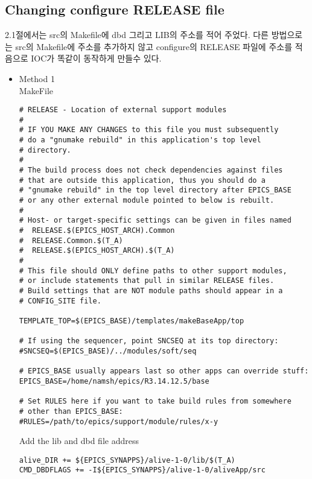 \documentclass[11pt
  , a4paper
  , article
  , oneside
]{memoir}
\begin{document}
\subsection{Changing configure RELEASE file}
2.1절에서는 src의 Makefile에 dbd 그리고 LIB의 주소를 적어 주었다. 다른 방법으로는
src의 Makefile에 주소를 추가하지 않고 configure의 RELEASE 파일에 주소를 적음으로 IOC가 똑같이
동작하게 만들수 있다.
\begin{itemize}
\item Method 1\\
MakeFile

\begin{lstlisting}[style=termstyle]
# RELEASE - Location of external support modules
#
# IF YOU MAKE ANY CHANGES to this file you must subsequently
# do a "gnumake rebuild" in this application's top level
# directory.
#
# The build process does not check dependencies against files
# that are outside this application, thus you should do a
# "gnumake rebuild" in the top level directory after EPICS_BASE
# or any other external module pointed to below is rebuilt.
#
# Host- or target-specific settings can be given in files named
#  RELEASE.$(EPICS_HOST_ARCH).Common
#  RELEASE.Common.$(T_A)
#  RELEASE.$(EPICS_HOST_ARCH).$(T_A)
#
# This file should ONLY define paths to other support modules,
# or include statements that pull in similar RELEASE files.
# Build settings that are NOT module paths should appear in a
# CONFIG_SITE file.

TEMPLATE_TOP=$(EPICS_BASE)/templates/makeBaseApp/top

# If using the sequencer, point SNCSEQ at its top directory:
#SNCSEQ=$(EPICS_BASE)/../modules/soft/seq

# EPICS_BASE usually appears last so other apps can override stuff:
EPICS_BASE=/home/namsh/epics/R3.14.12.5/base

# Set RULES here if you want to take build rules from somewhere
# other than EPICS_BASE:
#RULES=/path/to/epics/support/module/rules/x-y
\end{lstlisting}
Add the lib and dbd file address
	\begin{lstlisting}[style=termstyle]
alive_DIR += ${EPICS_SYNAPPS}/alive-1-0/lib/$(T_A)
CMD_DBDFLAGS += -I${EPICS_SYNAPPS}/alive-1-0/aliveApp/src


\end{lstlisting}
\end{itemize}
\end{document}

